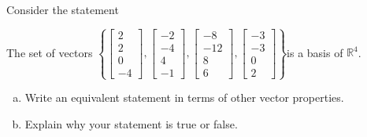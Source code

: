 
\begin{exerciseStatement}


Consider the statement 
\begin{center}\begin{minipage}{0.8\textwidth}
 The set of vectors \( \left\{ \left[\begin{array}{c}
2 \\
2 \\
0 \\
-4
\end{array}\right] , \left[\begin{array}{c}
-2 \\
-4 \\
4 \\
-1
\end{array}\right] , \left[\begin{array}{c}
-8 \\
-12 \\
8 \\
6
\end{array}\right] , \left[\begin{array}{c}
-3 \\
-3 \\
0 \\
2
\end{array}\right] \right\} \)is a basis of \(\mathbb{R}^4\). 
\end{minipage}\end{center}
    


\begin{enumerate}[(a)]
\item  Write an equivalent statement in terms of other vector properties.
\item  Explain why your statement is true or false.
\end{enumerate}
    
\end{exerciseStatement}
    
